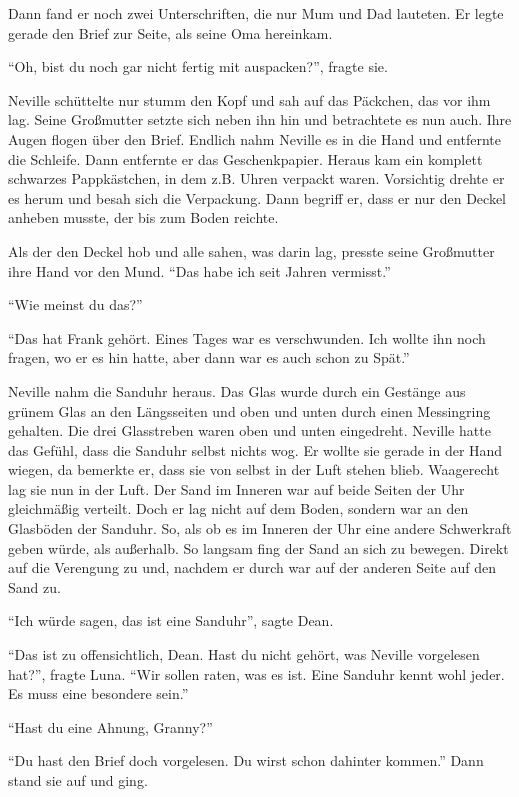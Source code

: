 Dann fand er noch zwei Unterschriften, die nur Mum und Dad lauteten. Er legte gerade den Brief zur Seite, als seine Oma hereinkam.

\enquote{Oh, bist du noch gar nicht fertig mit auspacken?}, fragte sie.

Neville schüttelte nur stumm den Kopf und sah auf das Päckchen, das vor ihm lag. Seine Großmutter setzte sich neben ihn hin und betrachtete es nun auch. Ihre Augen flogen über den Brief. Endlich nahm Neville es in die Hand und entfernte die Schleife. Dann entfernte er das Geschenkpapier. Heraus kam ein komplett schwarzes Pappkästchen, in dem z.B. Uhren verpackt waren. Vorsichtig drehte er es herum und besah sich die Verpackung. Dann begriff er, dass er nur den Deckel anheben musste, der bis zum Boden reichte.

Als der den Deckel hob und alle sahen, was darin lag, presste seine Großmutter ihre Hand vor den Mund. \enquote{Das habe ich seit Jahren vermisst.}

\enquote{Wie meinst du das?}

\enquote{Das hat Frank gehört. Eines Tages war es verschwunden. Ich wollte ihn noch fragen, wo er es hin hatte, aber dann war es auch schon zu Spät.}

Neville nahm die Sanduhr heraus. Das Glas wurde durch ein Gestänge aus grünem Glas an den Längsseiten und oben und unten durch einen Messingring gehalten. Die drei Glasstreben waren oben und unten eingedreht. Neville hatte das Gefühl, dass die Sanduhr selbst nichts wog. Er wollte sie gerade in der Hand wiegen, da bemerkte er, dass sie von selbst in der Luft stehen blieb. Waagerecht lag sie nun in der Luft. Der Sand im Inneren war auf beide Seiten der Uhr gleichmäßig verteilt. Doch er lag nicht auf dem Boden, sondern war an den Glasböden der Sanduhr. So, als ob es im Inneren der Uhr eine andere Schwerkraft geben würde, als außerhalb. So langsam fing der Sand an sich zu bewegen. Direkt auf die Verengung zu und, nachdem er durch war auf der anderen Seite auf den Sand zu.

\enquote{Ich würde sagen, das ist eine Sanduhr}, sagte Dean.

\enquote{Das ist zu offensichtlich, Dean. Hast du nicht gehört, was Neville vorgelesen hat?}, fragte Luna. \enquote{Wir sollen raten, was es ist. Eine Sanduhr kennt wohl jeder. Es muss eine besondere sein.}

\enquote{Hast du eine Ahnung, Granny?}

\enquote{Du hast den Brief doch vorgelesen. Du wirst schon dahinter kommen.} Dann stand sie auf und ging.

